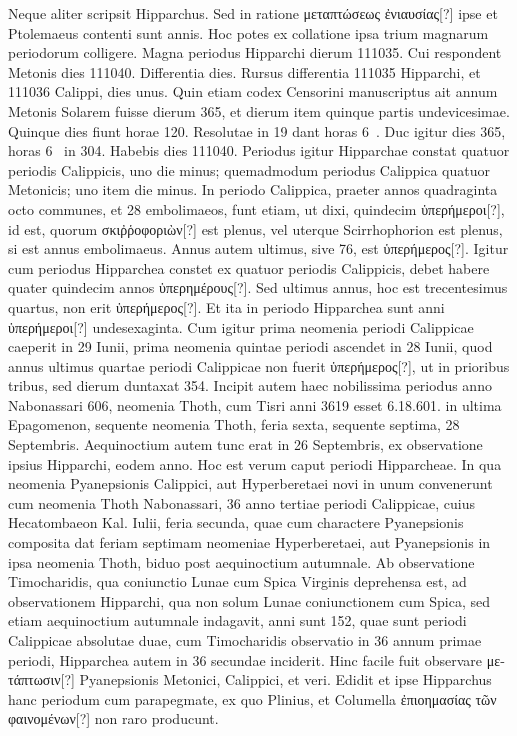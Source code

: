 Neque aliter scripsit Hipparchus.
Sed
in ratione \textgreek{μεταπτώσεως ἐνιαυσίας[?]} ipse et
Ptolemaeus contenti sunt  annis.
Hoc potes ex collatione ipsa trium magnarum
periodorum colligere.
Magna
periodus Hipparchi dierum 111035.
Cui respondent Metonis dies 111040.
Differentia  dies.
Rursus differentia
111035 Hipparchi, et 111036 Calippi,
dies unus.
Quin etiam codex Censorini
manuscriptus ait annum Metonis Solarem fuisse dierum 365, et
dierum item quinque partis undevicesimae.
Quinque dies fiunt
horae 120.
Resolutae in 19 dant horas 6~.
Duc igitur dies 365, horas
6~ in 304.
Habebis dies 111040.
Periodus igitur Hipparchae constat
quatuor periodis Calippicis, uno die minus; quemadmodum periodus
Calippica quatuor Metonicis; uno item die minus.
In periodo
Calippica, praeter annos quadraginta octo communes, et 28 embolimaeos,
funt etiam, ut dixi, quindecim \textgreek{ὑπερήμεροι[?]},
 id est, quorum \textgreek{σκιῤῥοφοριὼν[?]}
est plenus, vel uterque Scirrhophorion est plenus, si est annus
embolimaeus.
Annus autem ultimus, sive 76, est \textgreek{ὑπερήμερος[?]}.
Igitur
cum periodus Hipparchea constet ex quatuor periodis Calippicis, debet
habere quater quindecim annos \textgreek{ὑπερημέρους[?]}.
Sed ultimus annus,
hoc est trecentesimus quartus, non erit \textgreek{ὑπερήμερος[?]}.
Et ita in periodo
Hipparchea sunt anni \textgreek{ὑπερήμεροι[?]} undesexaginta.
Cum igitur prima
neomenia periodi Calippicae caeperit in 29 Iunii, prima neomenia
quintae periodi ascendet in 28 Iunii, quod annus ultimus quartae periodi
Calippicae non fuerit \textgreek{ὑπερήμερος[?]},
 ut in prioribus tribus, sed dierum
duntaxat 354.
%
Incipit autem haec nobilissima periodus anno
Nabonassari 606, neomenia Thoth, cum Tisri anni 3619 esset 6.18.601.
in ultima Epagomenon, sequente neomenia Thoth, feria sexta,
sequente septima, 28 Septembris.
Aequinoctium autem tunc erat in 26
Septembris, ex observatione ipsius Hipparchi, eodem anno.
Hoc est
verum caput periodi Hipparcheae.
In qua neomenia Pyanepsionis
Calippici, aut Hyperberetaei novi in unum convenerunt cum neomenia
Thoth Nabonassari, 36 anno tertiae periodi Calippicae, cuius Hecatombaeon
Kal. %
Iulii, feria secunda, quae cum charactere Pyanepsionis
composita dat feriam septimam neomeniae Hyperberetaei, aut Pyanepsionis
in ipsa neomenia Thoth, biduo post aequinoctium autumnale.
Ab observatione Timocharidis, qua coniunctio Lunae cum Spica
Virginis deprehensa est, ad observationem Hipparchi, qua non solum
Lunae coniunctionem cum Spica, sed etiam aequinoctium autumnale
indagavit, anni sunt 152, quae sunt periodi Calippicae absolutae
duae, cum Timocharidis observatio in 36 annum primae periodi,
Hipparchea autem in 36 secundae inciderit.
Hinc facile fuit observare
\textgreek{μετάπτωσιν[?]} Pyanepsionis Metonici, Calippici, et veri.
Edidit et
ipse Hipparchus hanc periodum cum parapegmate, ex quo Plinius,
et Columella \textgreek{ἐπιοημασίας τῶν φαινομένων[?]} non raro producunt.
%
